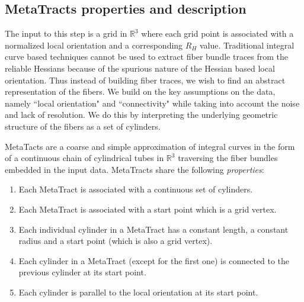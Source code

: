 \subsection {MetaTracts properties and description} 
\label{subsec:mtprop}
The input to this step is a grid in $\mathbb{R}^3$ where each grid point is associated with a normalized local orientation and a corresponding $R_H$ value.
Traditional integral curve based techniques cannot be used to extract fiber bundle traces from the reliable Hessians because of the spurious nature of the Hessian based local orientation. Thus instead of building fiber traces, we wish to find an abstract representation of the fibers. We build on the key assumptions on the data, namely ``local orientation" and ``connectivity" while taking into account the noise and lack of resolution. We do this by interpreting the underlying geometric structure of the fibers as a set of cylinders.

 MetaTacts  are a coarse and simple approximation of integral curves in the form of a continuous chain of cylindrical tubes in $\mathbb{R}^3$ traversing the fiber bundles embedded in the input data. MetaTracts share the following \textit{properties}:

\begin{enumerate}[noitemsep]
\item{Each MetaTract is associated with a continuous set of cylinders.}
\item{Each MetaTract is associated with a start point which is a grid vertex.}
\item{Each individual cylinder in a MetaTract has a constant length, a constant radius and a start point (which is also a grid vertex).}
\item{Each cylinder in a MetaTract (except for the first one) is connected to the previous cylinder at its start point.}
\item{Each cylinder is parallel to the local orientation at its start point.}
\end{enumerate}



